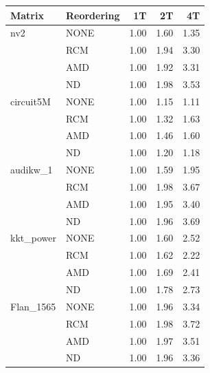 \begin{table}[htbp]
  \centering
  \label{tab:scaling_x86}
  \begin{tabular}{llrrr}
    \toprule
    \textbf{Matrix} & \textbf{Reordering} & \textbf{1T} & \textbf{2T} & \textbf{4T} \\
    \midrule
    nv2 & NONE & 1.00 & 1.60 & 1.35 \\
     & RCM & 1.00 & 1.94 & 3.30 \\
     & AMD & 1.00 & 1.92 & 3.31 \\
     & ND & 1.00 & 1.98 & 3.53 \\
    \midrule
    circuit5M & NONE & 1.00 & 1.15 & 1.11 \\
     & RCM & 1.00 & 1.32 & 1.63 \\
     & AMD & 1.00 & 1.46 & 1.60 \\
     & ND & 1.00 & 1.20 & 1.18 \\
    \midrule
    audikw\_1 & NONE & 1.00 & 1.59 & 1.95 \\
     & RCM & 1.00 & 1.98 & 3.67 \\
     & AMD & 1.00 & 1.95 & 3.40 \\
     & ND & 1.00 & 1.96 & 3.69 \\
    \midrule
    kkt\_power & NONE & 1.00 & 1.60 & 2.52 \\
     & RCM & 1.00 & 1.62 & 2.22 \\
     & AMD & 1.00 & 1.69 & 2.41 \\
     & ND & 1.00 & 1.78 & 2.73 \\
    \midrule
    Flan\_1565 & NONE & 1.00 & 1.96 & 3.34 \\
     & RCM & 1.00 & 1.98 & 3.72 \\
     & AMD & 1.00 & 1.97 & 3.51 \\
     & ND & 1.00 & 1.96 & 3.36 \\
    \bottomrule
  \end{tabular}
\end{table}